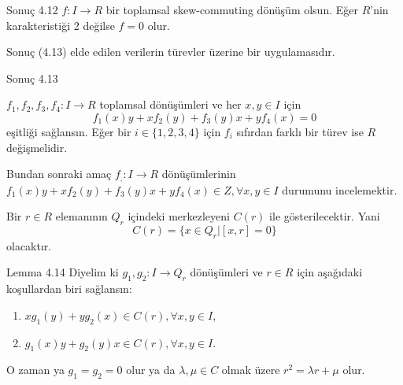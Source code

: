 \documentclass{beamer}
\begin{document}
\begin{frame}

\begin{block}{Sonuç 4.12}
$f \colon I \to R$ bir toplamsal skew-commuting dönüşüm olsun. Eğer $R$'nin karakteristiği 2 değilse $f = 0$ olur.
\end{block}
    
\end{frame}

\begin{frame}

Sonuç (4.13) elde edilen verilerin türevler üzerine bir uygulamasıdır.

\begin{block}{Sonuç 4.13}

$f_1, f_2, f_3, f_4 \colon I \to R$ toplamsal dönüşümleri ve her $x, y \in I$ için
\begin{equation*}
    f_1(x)y + xf_2(y) + f_3(y)x + yf_4(x) = 0
\end{equation*}
eşitliği sağlansın. Eğer bir $i \in \{1, 2, 3, 4\}$ için $f_i$ sıfırdan farklı bir türev ise $R$ değişmelidir.
\end{block}

Bundan sonraki amaç $f_, \colon I \to R$ dönüşümlerinin $f_1(x)y + xf_2(y) + f_3(y)x + yf_4(x) \in Z, \forall x, y \in I$ durumunu incelemektir.\\
    
\end{frame}

\begin{frame}
    
Bir $r \in R$ elemanının $Q_r$ içindeki merkezleyeni $C(r)$ ile gösterilecektir. Yani
\begin{equation*}
    C(r) = \{x \in Q_r | [x,r] = 0\}
\end{equation*}
olacaktır.

\end{frame}

\begin{frame}

\begin{block}{Lemma 4.14}
Diyelim ki $g_1, g_2 \colon I \to Q_r$ dönüşümleri ve $r \in R$ için aşağıdaki koşullardan biri sağlansın:
\begin{enumerate}
    \item $xg_1(y) + yg_2(x) \in C(r), \forall x, y \in I$,
    \item $g_1(x)y + g_2(y)x \in C(r), \forall x, y \in I$.
\end{enumerate}
O zaman ya $g_1 = g_2 = 0$ olur ya da $\lambda, \mu \in C$ olmak üzere $r^2 = \lambda r + \mu$ olur.
\end{block}
    
\end{frame}
\end{document}

